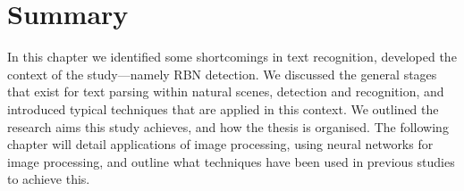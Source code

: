 




\section*{Summary}

In this chapter we identified some shortcomings in text recognition, developed the context of the study---namely RBN detection. We discussed the general stages that exist for text parsing within natural scenes, detection and recognition, and introduced typical techniques that are applied in this context. We outlined the research aims this study achieves, and how the thesis is organised. The following chapter will detail applications of image processing, using neural networks for image processing, and outline what techniques have been used in previous studies to achieve this.